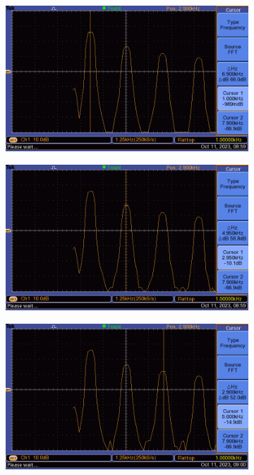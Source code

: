 \begin{enumerate}
\begin{figure}[H]
              \centering
              \begin{subfigure}{0.4\textwidth}
                  \includegraphics[width=\linewidth]{images/problem2_hardcopy2.png}
              \end{subfigure}
              \begin{subfigure}{0.4\textwidth}
                  \includegraphics[width=\linewidth]{images/problem2_hardcopy3.png}
              \end{subfigure}
              \begin{subfigure}{0.4\textwidth}
                  \includegraphics[width=\linewidth]{images/problem2_hardcopy4.png}

\end{subfigure}
\end{figure}
\end{enumerate}

